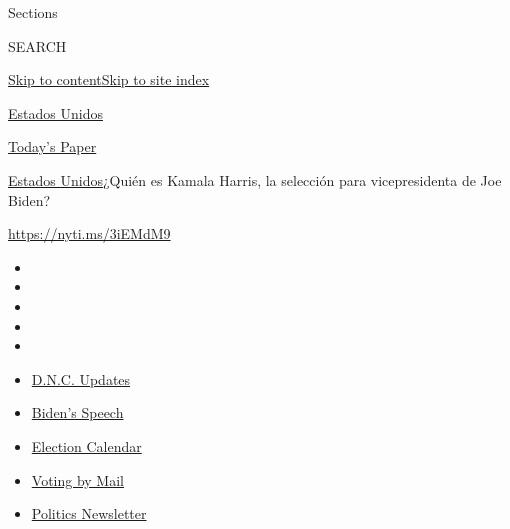 Sections

SEARCH

\protect\hyperlink{site-content}{Skip to
content}\protect\hyperlink{site-index}{Skip to site index}

\href{https://www.nytimes3xbfgragh.onion/es/section/estados-unidos}{Estados
Unidos}

\href{https://myaccount.nytimes3xbfgragh.onion/auth/login?response_type=cookie\&client_id=vi}{}

\href{https://www.nytimes3xbfgragh.onion/section/todayspaper}{Today's
Paper}

\href{/es/section/estados-unidos}{Estados Unidos}\textbar{}¿Quién es
Kamala Harris, la selección para vicepresidenta de Joe Biden?

\url{https://nyti.ms/3iEMdM9}

\begin{itemize}
\item
\item
\item
\item
\item
\end{itemize}

\begin{itemize}
\item
  \href{https://www.nytimes3xbfgragh.onion/live/2020/08/20/us/dnc-convention-election?action=click\&pgtype=Article\&state=default\&region=TOP_BANNER\&context=storylines_menu}{D.N.C.
  Updates}
\item
  \href{https://www.nytimes3xbfgragh.onion/2020/08/20/us/politics/biden-presidential-nomination-dnc.html?action=click\&pgtype=Article\&state=default\&region=TOP_BANNER\&context=storylines_menu}{Biden's
  Speech}
\item
  \href{https://www.nytimes3xbfgragh.onion/interactive/2019/us/elections/2020-presidential-election-calendar.html?action=click\&pgtype=Article\&state=default\&region=TOP_BANNER\&context=storylines_menu}{Election
  Calendar}
\item
  \href{https://www.nytimes3xbfgragh.onion/interactive/2020/08/11/us/politics/vote-by-mail-us-states.html?action=click\&pgtype=Article\&state=default\&region=TOP_BANNER\&context=storylines_menu}{Voting
  by Mail}
\item
  \href{https://www.nytimes3xbfgragh.onion/newsletters/politics?action=click\&pgtype=Article\&state=default\&region=TOP_BANNER\&context=storylines_menu}{Politics
  Newsletter}
\end{itemize}

